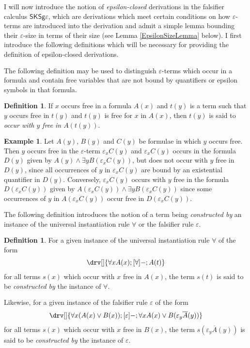 \documentclass[10pt]{article}
\theoremstyle{definition}\newtheorem{remark}[theorem]{Remark}
\theoremstyle{definition}\newtheorem{example}[theorem]{Example}
\theoremstyle{definition}\newtheorem{definition}[theorem]{Definition}
\newcommand{\FalsifierCalculus}{{\mathsf{SKSg\varepsilon}}}
\newcommand{\falsifierRule}{{\mathsf{\varepsilon}}}
\begin{document}
	I will now introduce the notion of \textit{epsilon-closed} derivations in the falsifier calculus $\FalsifierCalculus$, which are derivations which meet certain conditions on how $\varepsilon$-terms are introduced into the derivation and admit a simple lemma bounding their $\varepsilon$-size in terms of their size (see Lemma \ref{EpsilonSizeLemma} below). I first introduce the following definitions which will be necessary for providing the definition of epsilon-closed derivations.
	
	The following definition may be used to distinguish $\varepsilon$-terms which occur in a formula and contain free variables that are not bound by quantifiers or epsilon symbols in that formula.
	
	\begin{definition}
		If $x$ occurs free in a formula $A(x)$ and $t(y)$ is a term such that $y$ occurs free in $t(y)$ and $t(y)$ is free for $x$ in $A(x)$, then $t(y)$ is said to \textit{occur with $y$ free in $A(t(y))$}.
	\end{definition}
	
	\begin{example}
		Let $A(y)$, $B(y)$ and $C(y)$ be formulae in which $y$ occurs free. Then $y$ occurs free in the $\varepsilon$-term $\varepsilon_x C(y)$ and $\varepsilon_x C(y)$ occurs in the formula $D(y)$ given by $A(y) \land \exists y B(\varepsilon_x C(y))$, but does not occur with $y$ free in $D(y)$, since all occurrences of $y$ in $\varepsilon_x C(y)$ are bound by an existential quantifier in $D(y)$. Conversely, $\varepsilon_x C(y)$ occurs with $y$ free in the formula $D(\varepsilon_x C(y))$ given by $A(\varepsilon_x C(y)) \land \exists y B(\varepsilon_x C(y))$ since some occurrences of $y$ in $A(\varepsilon_x C(y))$ occur free in $D(\varepsilon_x C(y))$.
	\end{example}
	
	The following definition introduces the notion of a term being \textit{constructed by} an instance of the universal instantiation rule $\forall$ or the falsifier rule $\falsifierRule$.
	
	\begin{definition}
		For a given instance of the universal instantiation rule $\forall$ of the form
		\[
			\drv[] {
				\forall x A(x) ; [\forall]- ; A(t)
			}
		\]
		for all terms $s(x)$ which occur with $x$ free in $A(x)$, the term $s(t)$ is said to be \textit{constructed by} the instance of $\forall$.
		
		Likewise, for a given instance of the falsifier rule $\falsifierRule$ of the form
		\[
		\drv[] {
			\forall x (A(x) \lor B(x)) ; [\falsifierRule]- ; \forall x A(x) \lor B(\varepsilon_y \overline{A}(y))
		}
		\]
		for all terms $s(x)$ which occur with $x$ free in $B(x)$, the term $s(\varepsilon_y \overline{A}(y))$ is said to be \textit{constructed by} the instance of $\falsifierRule$.
	\end{definition}
	
\end{document}

